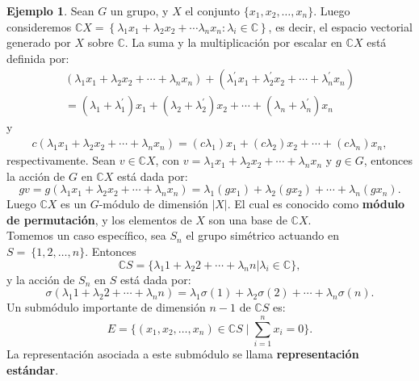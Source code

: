 \documentclass[12pt]{book}
\theoremstyle{definition}
\newtheorem{example}[theorem]{Ejemplo}
\newcounter{in}
\newcounter{ini}
\begin{document}
\begin{example}
\label{ex_mod_per}
Sean $G$ un grupo, y $X$ el conjunto
$\{x_{1},x_{2},\ldots,x_{n}\}$. Luego consideremos
$\mathbb{C} X = \left \{ \lambda_1 x_{1} +\lambda_2 x_{2} + \cdots
  \lambda_n x_{n} : \lambda_{i} \in \mathbb{C} \right \}$, es decir,
el espacio vectorial generado por $X$ sobre $\mathbb{C}$.  La suma y
la multiplicación por escalar en $\mathbb{C} X$ está definida por:
  \begin{eqnarray*}
    (\lambda_{1}x_{1}+\lambda_{2}x_{2}+\cdots
    +\lambda_{n}x_{n})+(\lambda^{'}_{1}x_{1}+\lambda^{'}_{2}x_{2}+\cdots +\lambda^{'}_{n}x_{n})\\
    =(\lambda_{1}+\lambda^{'}_{1})x_{1}+(\lambda_{2}+\lambda^{'}_{2})x_{2}+\cdots
    +(\lambda_{n}+\lambda^{'}_{n})x_{n}
  \end{eqnarray*}
  y
  \begin{eqnarray*}
    c(\lambda_{1}x_{1}+\lambda_{2}x_{2}+\cdots +\lambda_{n}x_{n})=(c\lambda_{1})x_{1}+(c\lambda_{2})x_{2}+\cdots +(c\lambda_{n})x_{n},
  \end{eqnarray*}
  respectivamente. Sean $v\in \mathbb{C}X$, con
  $v=\lambda_{1}x_{1}+\lambda_{2}x_{2}+\cdots+\lambda_{n}x_{n}$ y $g\in G$, entonces la acción de $G$ en $\mathbb{C}X$ está dada por:
  \begin{equation*}
    gv=g(\lambda_{1}x_{1}+\lambda_{2}x_{2}+\cdots +\lambda_{n}x_{n})=\lambda_{1}(gx_{1})+\lambda_{2}(gx_{2})+\cdots +\lambda_{n}(gx_{n}).
\end{equation*}
Luego $\mathbb{C}X$ es un $G$-módulo de dimensión $|X|$. El cual es
conocido como \textbf{módulo de permutación}, y los elementos de $X$
son una base de $\mathbb{C}X$.\\
Tomemos un caso específico, sea $S_{n}$ el grupo simétrico actuando en $S =~ \{1, 2, \ldots,
n\}$. Entonces
\begin{equation*}
\mathbb{C}S=\{\lambda_{1}1 + \lambda_{2}2 + \cdots + \lambda_{n}n|
\lambda_{i} \in \mathbb{C} \},
\end{equation*}
y la acción de $S_{n}$ en $S$ está dada
por:
 \begin{equation*}
\sigma(\lambda_{1}1 + \lambda_{2}2 + \cdots + \lambda_{n}n)= \lambda_{1}\sigma(1) + \lambda_{2}\sigma(2) + \cdots + \lambda_{n}\sigma(n).
 \end{equation*}
 Un submódulo importante de dimensión $n-1$ de $\mathbb{C}S$ es:
 \begin{equation*}
   E=\Big\{(x_{1},x_{2},\ldots,x_{n})\in \mathbb{C}S \mid\sum^{n}_{i=1}x_{i}=0\Big\}.
 \end{equation*}
 La representación asociada a este submódulo se llama
 \textbf{representación es\-tán\-dar}.


\end{example}
\end{document}
